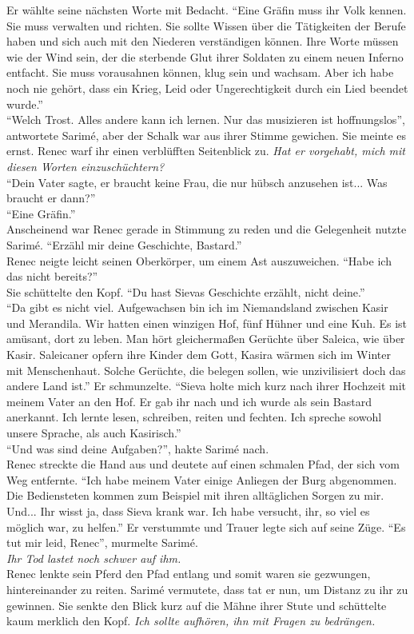 Er wählte seine nächsten Worte mit Bedacht. ``Eine Gräfin muss ihr Volk kennen. Sie muss verwalten 
und richten. Sie sollte Wissen über die Tätigkeiten der Berufe haben und sich auch mit den Niederen 
verständigen können. Ihre Worte müssen wie der Wind sein, der die sterbende Glut ihrer Soldaten zu 
einem neuen Inferno entfacht. Sie muss vorausahnen können, klug sein und wachsam. Aber ich habe 
noch nie gehört, dass ein Krieg, Leid oder Ungerechtigkeit durch ein Lied beendet wurde.''\\
``Welch Trost. Alles andere kann ich lernen. Nur das musizieren ist hoffnungslos'', antwortete 
Sarimé, aber der Schalk war aus ihrer Stimme gewichen. Sie meinte es ernst. Renec warf ihr einen 
verblüfften Seitenblick zu. \textit{Hat er vorgehabt, mich mit diesen Worten einzuschüchtern?}\\
``Dein Vater sagte, er braucht keine Frau, die nur hübsch anzusehen ist... Was braucht er dann?''\\
``Eine Gräfin.''\\
Anscheinend war Renec gerade in Stimmung zu reden und die Gelegenheit nutzte Sarimé. ``Erzähl mir 
deine Geschichte, Bastard.''\\
Renec neigte leicht seinen Oberkörper, um einem Ast auszuweichen. ``Habe ich das nicht bereits?''\\
Sie schüttelte den Kopf. ``Du hast Sievas Geschichte erzählt, nicht deine.''\\
``Da gibt es nicht viel. Aufgewachsen bin ich im Niemandsland zwischen Kasir und Merandila. Wir 
hatten einen winzigen Hof, fünf Hühner und eine Kuh. Es ist amüsant, dort zu leben. Man hört 
gleichermaßen Gerüchte über Saleica, wie über Kasir. Saleicaner opfern ihre Kinder dem Gott, Kasira 
wärmen sich im Winter mit Menschenhaut. Solche Gerüchte, die belegen sollen, wie unzivilisiert doch 
das andere Land ist.'' Er schmunzelte. ``Sieva holte mich kurz nach ihrer Hochzeit mit meinem Vater 
an den Hof. Er gab ihr nach und ich wurde als sein Bastard anerkannt. Ich lernte lesen, schreiben, 
reiten und fechten. Ich spreche sowohl unsere Sprache, als auch Kasirisch.''\\
``Und was sind deine Aufgaben?'', hakte Sarimé nach.\\
Renec streckte die Hand aus und deutete auf einen schmalen Pfad, der sich vom Weg entfernte. ``Ich 
habe meinem Vater einige Anliegen der Burg abgenommen. Die Bediensteten kommen zum Beispiel mit 
ihren alltäglichen Sorgen zu mir. Und... Ihr wisst ja, dass Sieva krank war. Ich habe versucht, 
ihr, so viel es möglich war, zu helfen.'' Er verstummte und Trauer legte sich auf seine Züge.
``Es tut mir leid, Renec'', murmelte Sarimé.\\
\textit{Ihr Tod lastet noch schwer auf ihm.}\\
Renec lenkte sein Pferd den Pfad entlang und somit waren sie gezwungen, hintereinander zu reiten. 
Sarimé vermutete, dass tat er nun, um Distanz zu ihr zu gewinnen. Sie senkte den Blick kurz auf die 
Mähne ihrer Stute und schüttelte kaum merklich den Kopf. \textit{Ich sollte aufhören, ihn mit 
Fragen zu bedrängen.}\\


